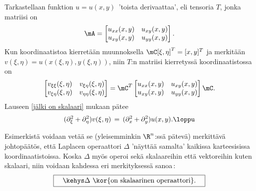 \begin{Exa} Tarkastellaan funktion $u=u(x,y)\,$ 'toista derivaattaa', eli tensoria $T$, jonka
matriisi on
\[
\mA = \begin{bmatrix} u_{xx}(x,y) & u_{xy}(x,y) \\ u_{xy}(x,y) & u_{yy}(x,y) \end{bmatrix}.
\]
Kun koordinaatistoa kierretään muunnoksella $\mC[\xi,\eta]^T=[x,y]^T$ ja merkitään 
$v(\xi,\eta)=u(x(\xi,\eta),y(\xi,\eta))$, niin $T$:n matriisi kierretyssä koordinaatistossa on
\[
\begin{bmatrix} 
v_{\xi\xi}(\xi,\eta) & v_{\xi\eta}(\xi,\eta) \\ v_{\xi\eta}(\xi,\eta) & v_{\eta\eta}(\xi,\eta)
\end{bmatrix}
= \mC^T \begin{bmatrix} 
        u_{xx}(x,y) & u_{xy}(x,y) \\ u_{xy}(x,y) & u_{yy}(x,y) 
        \end{bmatrix} \mC.
\]
Lauseen \ref{jälki on skalaari} mukaan pätee
\[
(\partial_\xi^2+\partial_\eta^2)v(\xi,\eta)\,=\,(\partial_x^2+\partial_y^2)u(x,y). \loppu
\]
\end{Exa}
Esimerkistä voidaan vetää se (yleisemminkin $\R^n$:ssä pätevä) merkittävä johtopäätös, että
Laplacen operaattori $\Delta$ 'näyttää samalta' kaikissa karteesisissa koordinaatistoissa.
Koska $\Delta$ myös operoi sekä skalaareihin että vektoreihin kuten skalaari, niin voidaan
kahdessa eri merkityksessä sanoa\,:
\[
\boxed{\quad\kehys \text{$\Delta$ \kor{on skalaarinen operaattori}}. \quad}
\]

